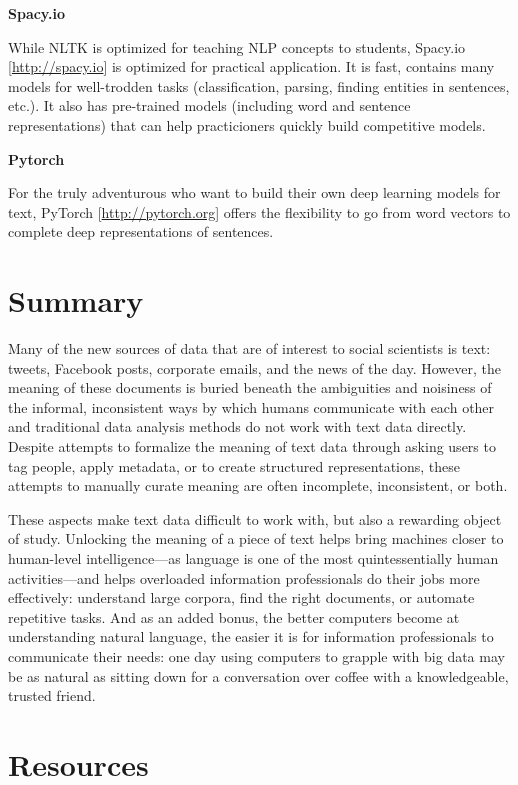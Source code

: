 \documentclass[]{krantz}
\begin{document}
\textbf{Spacy.io}

While NLTK is optimized for teaching NLP concepts to students, Spacy.io
{[}\url{http://spacy.io}{]} is optimized for practical application. It
is fast, contains many models for well-trodden tasks (classification,
parsing, finding entities in sentences, etc.). It also has pre-trained
models (including word and sentence representations) that can help
practicioners quickly build competitive models.

\textbf{Pytorch}

For the truly adventurous who want to build their own deep learning
models for text, PyTorch {[}\url{http://pytorch.org}{]} offers the
flexibility to go from word vectors to complete deep representations of
sentences.

\section{Summary}\label{summary-5}

Many of the new sources of data that are of interest to social
scientists is text: tweets, Facebook posts, corporate emails, and the
news of the day. However, the meaning of these documents is buried
beneath the ambiguities and noisiness of the informal, inconsistent ways
by which humans communicate with each other and traditional data
analysis methods do not work with text data directly. Despite attempts
to formalize the meaning of text data through asking users to tag
people, apply metadata, or to create structured representations, these
attempts to manually curate meaning are often incomplete, inconsistent,
or both.

These aspects make text data difficult to work with, but also a
rewarding object of study. Unlocking the meaning of a piece of text
helps bring machines closer to human-level intelligence---as language is
one of the most quintessentially human activities---and helps overloaded
information professionals do their jobs more effectively: understand
large corpora, find the right documents, or automate repetitive tasks.
And as an added bonus, the better computers become at understanding
natural language, the easier it is for information professionals to
communicate their needs: one day using computers to grapple with big
data may be as natural as sitting down for a conversation over coffee
with a knowledgeable, trusted friend.

\section{Resources}\label{resources-3}
\end{document}

